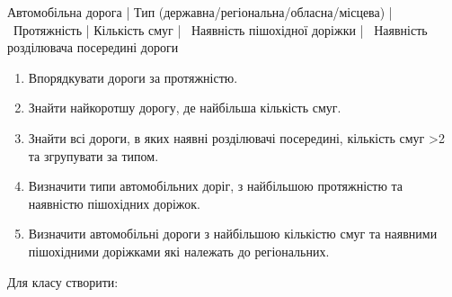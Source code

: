 \documentclass[14pt]{extarticle}
\begin{document}
Автомобільна дорога | Тип (державна/регіональна/обласна/місцева) |  Протяжність | Кількість смуг |  Наявність пішохідної доріжки |  Наявність розділювача посередині дороги
\begin{enumerate}
\item Впорядкувати дороги за протяжністю.
\item Знайти найкоротшу дорогу, де найбільша кількість смуг.
\item Знайти всі дороги, в яких наявні розділювачі посередині, кількість смуг >2 та згрупувати за типом.
\item Визначити типи автомобільних доріг, з найбільшою протяжністю та наявністю пішохідних доріжок.
\item Визначити автомобільні дороги з найбільшою кількістю смуг та наявними пішохідними доріжками які належать до регіональних.
\end{enumerate}
Для класу створити:
\end{document}
